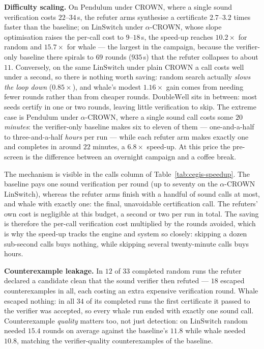 \textbf{Difficulty scaling.} On $\mathrm{Pendulum}$ under CROWN, where a single sound verification
costs $22$--$34$\,s, the refuter arms synthesise a certificate $2.7$--$3.2$
times faster than the baseline; on $\mathrm{LinSwitch}$ under $\alpha$-CROWN,
whose slope optimisation raises the per-call cost to $9$--$18$\,s, the speed-up
reaches $10.2\times$ for random and $15.7\times$ for whale --- the largest in
the campaign, because the verifier-only baseline there spirals to $69$ rounds
($935$\,s) that the refuter collapses to about $11$. Conversely, on the same
$\mathrm{LinSwitch}$ under plain CROWN a call costs well under a second, so there is
nothing worth saving: random search actually \emph{slows the loop down}
($0.85\times$), and whale's modest $1.16\times$ gain comes from needing fewer
rounds rather than from cheaper rounds. $\mathrm{DoubleWell}$ sits in between: most
seeds certify in one or two rounds, leaving little verification to skip. The
extreme case is $\mathrm{Pendulum}$ under $\alpha$-CROWN, where a single sound call
costs some $20$ \emph{minutes}: the verifier-only baseline makes six to eleven
of them --- one-and-a-half to three-and-a-half \emph{hours} per run --- while
each refuter arm makes exactly one and completes in around $22$ minutes, a
$6.8\times$ speed-up. At this price the pre-screen is the difference between an
overnight campaign and a coffee break.

The mechanism is visible in the calls column of Table~\ref{tab:cegis-speedup}.
The baseline pays one sound verification per round (up to seventy on the
$\alpha$-CROWN $\mathrm{LinSwitch}$), whereas the refuter arms finish with a handful
of sound calls at most, and whale with exactly one: the final, unavoidable
certification call. The refuters' own cost is negligible at this budget, a
second or two per run in total. The saving is therefore the per-call
verification cost multiplied by the rounds avoided, which is why the speed-up
tracks the engine and system so closely: skipping a dozen sub-second calls buys
nothing, while skipping several twenty-minute calls buys hours.

\textbf{Counterexample leakage.} In $12$ of $33$
completed random runs the refuter declared a candidate clean that the sound
verifier then refuted --- $18$ escaped counterexamples in all, each costing an
extra expensive verification round. Whale escaped nothing: in all $34$ of its
completed runs the first certificate it passed to the verifier was accepted,
so every whale run ended with exactly one sound call. Counterexample
\emph{quality} matters too, not just detection: on $\mathrm{LinSwitch}$ random
needed $15.4$ rounds on average against the baseline's $11.8$ while whale needed $10.8$,
matching the verifier-quality counterexamples of the baseline.

